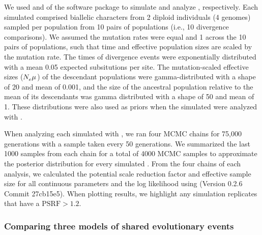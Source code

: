 \documentclass[letterpaper,12pt]{article}
\begin{document}
We used \simcoevolity and \ecoevolity of the \ecoevolity software
package
\citep[Version 0.3.2 Commit c1685dfa][]{Oaks2018ecoevolity}
to simulate and analyze \datasets, respectively.
Each simulated \dataset comprised biallelic characters from 2 diploid
individuals (4 genomes) sampled per population from 10 pairs of populations
(i.e., 10 divergence comparisons).
We assumed the mutation rates were equal and 1 across the 10 pairs of
populations, such that time and effective population sizes are scaled by the
mutation rate.
The times of divergence events were exponentially distributed with a mean 0.05
expected subsitutions per site.
The mutation-scaled effective sizes ($N_{e}^{}\mu_{}$) of the descendant
populations were gamma-distributed with a shape of 20 and mean of 0.001,
and the size of the ancestral population relative to the mean of its
descendants was gamma distributed with a shape of 50 and mean of 1.
These distributions were also used as priors when the simulated \datasets were
analyzed with \ecoevolity.


When analyzing each simulated \dataset with \ecoevolity,
we ran four MCMC chains for 75,000 generations with a sample taken every 50
generations.
We summarized the last 1000 samples from each chain for a total of 4000 MCMC
samples to approximate the posterior distribution for every simulated \dataset.
From the four chains of each analysis, we calculated the potential
scale reduction factor \citep[PSRF; the square root of Equation 1.1
in][]{Brooks1998} and effective sample size \citep[ESS;][]{Gong2014} for all
continuous parameters and the log likelihood using
\pycoevolity (Version 0.2.6 Commit 27cb15e5).
When plotting results, we highlight any simulation replicates that have a
$\textrm{PSRF} > 1.2$.


\subsubsection{Comparing three models of shared evolutionary events}
\end{document}

